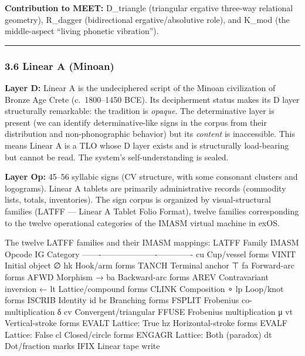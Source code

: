 \textbf{Contribution to MEET:} D\_triangle (triangular ergative
three-way relational geometry), R\_dagger (bidirectional
ergative/absolutive role), and K\_mod (the middle-aspect ``living
phonetic vibration'').

\begin{center}\rule{0.5\linewidth}{0.5pt}\end{center}

\subsubsection{3.6 Linear A (Minoan)}\label{linear-a-minoan}

\textbf{Layer D:} Linear A is the undeciphered script of the Minoan
civilization of Bronze Age Crete (c.~1800--1450 BCE). Its decipherment
status makes its D layer structurally remarkable: the tradition is
\emph{opaque}. The determinative layer is present (we can identify
determinative-like signs in the corpus from their distribution and
non-phonographic behavior) but its \emph{content} is inaccessible. This
means Linear A is a TLO whose D layer exists and is structurally
load-bearing but cannot be read. The system's self-understanding is
sealed.

\textbf{Layer Op:} 45--56 syllabic signs (CV structure, with some
consonant clusters and logograms). Linear A tablets are primarily
administrative records (commodity lists, totals, inventories). The sign
corpus is organized by visual-structural families (LATFF --- Linear A
Tablet Folio Format), twelve families corresponding to the twelve
operational categories of the IMASM virtual machine in exOS.

The twelve LATFF families and their IMASM mappings: \textbar{} LATFF
\textbar{} Family \textbar{} IMASM Opcode \textbar{} IG Category
\textbar{}
\textbar-------\textbar--------\textbar-------------\textbar-------------\textbar{}
\textbar{} cu \textbar{} Cup/vessel forms \textbar{} VINIT \textbar{}
Initial object ∅ \textbar{} \textbar{} hk \textbar{} Hook/arm forms
\textbar{} TANCH \textbar{} Terminal anchor ⊤ \textbar{} \textbar{} fa
\textbar{} Forward-arc forms \textbar{} AFWD \textbar{} Morphism →
\textbar{} \textbar{} ba \textbar{} Backward-arc forms \textbar{} AREV
\textbar{} Contravariant inversion ← \textbar{} \textbar{} lt \textbar{}
Lattice/compound forms \textbar{} CLINK \textbar{} Composition ∘
\textbar{} \textbar{} lp \textbar{} Loop/knot forms \textbar{} ISCRIB
\textbar{} Identity id \textbar{} \textbar{} br \textbar{} Branching
forms \textbar{} FSPLIT \textbar{} Frobenius co-multiplication δ
\textbar{} \textbar{} cv \textbar{} Convergent/triangular \textbar{}
FFUSE \textbar{} Frobenius multiplication μ \textbar{} \textbar{} vt
\textbar{} Vertical-stroke forms \textbar{} EVALT \textbar{} Lattice:
True \textbar{} \textbar{} hz \textbar{} Horizontal-stroke forms
\textbar{} EVALF \textbar{} Lattice: False \textbar{} \textbar{} cl
\textbar{} Closed/circle forms \textbar{} ENGAGR \textbar{} Lattice:
Both (paradox) \textbar{} \textbar{} dt \textbar{} Dot/fraction marks
\textbar{} IFIX \textbar{} Linear tape write \textbar{}

